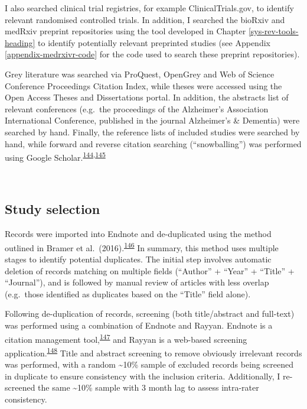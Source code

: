 \documentclass[a4paper, twoside]{templates/ociamthesis}
\begin{document}
I also searched clinical trial registries, for example ClinicalTrials.gov, to identify relevant randomised controlled trials. In addition, I searched the bioRxiv and medRxiv preprint repositories using the tool developed in Chapter \ref{sys-rev-tools-heading} to identify potentially relevant preprinted studies (see Appendix \ref{appendix-medrxivr-code} for the code used to search these preprint repositories).

Grey literature was searched via ProQuest, OpenGrey and Web of Science Conference Proceedings Citation Index, while theses were accessed using the Open Access Theses and Dissertations portal. In addition, the abstracts list of relevant conferences (e.g.~the proceedings of the Alzheimer's Association International Conference, published in the journal Alzheimer's \& Dementia) were searched by hand. Finally, the reference lists of included studies were searched by hand, while forward and reverse citation searching (``snowballing'') was performed using Google Scholar.\textsuperscript{\protect\hyperlink{ref-greenhalgh2005}{144},\protect\hyperlink{ref-wohlin2014}{145}}

~

\hypertarget{study-selection}{%
\subsection{Study selection}\label{study-selection}}

Records were imported into Endnote and de-duplicated using the method outlined in Bramer et al.~(2016).\textsuperscript{\protect\hyperlink{ref-bramer2016}{146}} In summary, this method uses multiple stages to identify potential duplicates. The initial step involves automatic deletion of records matching on multiple fields (``Author'' + ``Year'' + ``Title'' + ``Journal''), and is followed by manual review of articles with less overlap (e.g.~those identified as duplicates based on the ``Title'' field alone).

Following de-duplication of records, screening (both title/abstract and full-text) was performed using a combination of Endnote and Rayyan. Endnote is a citation management tool,\textsuperscript{\protect\hyperlink{ref-hupe2019}{147}} and Rayyan is a web-based screening application.\textsuperscript{\protect\hyperlink{ref-ouzzani2016}{148}} Title and abstract screening to remove obviously irrelevant records was performed, with a random \textasciitilde10\% sample of excluded records being screened in duplicate to ensure consistency with the inclusion criteria. Additionally, I re-screened the same \textasciitilde10\% sample with 3 month lag to assess intra-rater consistency.
\end{document}
